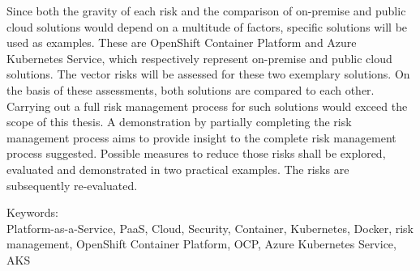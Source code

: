 Since both the gravity of each risk and the comparison of on-premise and public cloud solutions would depend on a multitude of factors, specific solutions will be used as examples. These are OpenShift Container Platform and Azure Kubernetes Service, which respectively represent on-premise and public cloud solutions.
The vector risks will be assessed for these two exemplary solutions.
On the basis of these assessments, both solutions are compared to each other.
Carrying out a full risk management process for such solutions would exceed the scope of this thesis.
A demonstration by partially completing the risk management process aims to provide insight to the complete risk management process suggested.
Possible measures to reduce those risks shall be explored, evaluated and demonstrated in two practical examples.
The risks are subsequently re-evaluated.

\bigskip

\noindent
Keywords: \\
Platform-as-a-Service, PaaS, Cloud, Security, Container, Kubernetes, Docker, risk management, OpenShift Container Platform, OCP, Azure Kubernetes Service, AKS

